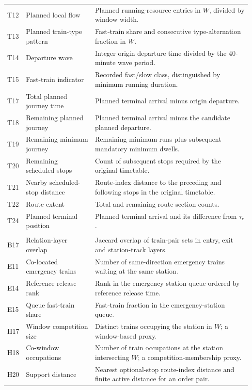 \begin{longtable}{@{}>{\raggedright\arraybackslash}p{0.8cm}>{\raggedright\arraybackslash}p{3.7cm}>{\raggedright\arraybackslash}p{10.0cm}@{}}
T12 & Planned local flow & Planned running-resource entries in $W$, divided by window width. \\
T13 & Planned train-type pattern & Fast-train share and consecutive type-alternation fraction in $W$. \\
T14 & Departure wave & Integer origin departure time divided by the 40-minute wave period. \\
T15 & Fast-train indicator & Recorded fast/slow class, distinguished by minimum running duration. \\
T17 & Total planned journey time & Planned terminal arrival minus origin departure. \\
T18 & Remaining planned journey & Planned terminal arrival minus the candidate planned departure. \\
T19 & Remaining minimum journey & Remaining minimum runs plus subsequent mandatory minimum dwells. \\
T20 & Remaining scheduled stops & Count of subsequent stops required by the original timetable. \\
T21 & Nearby scheduled-stop distance & Route-index distance to the preceding and following stops in the original timetable. \\
T22 & Route extent & Total and remaining route section counts. \\
T24 & Planned terminal position & Planned terminal arrival and its difference from $\tau_e$. \\
\multicolumn{3}{@{}l}{\textbf{Train interactions}}\\*[2pt]
B17 & Relation-layer overlap & Jaccard overlap of train-pair sets in entry, exit and station-track layers. \\
E11 & Co-located emergency trains & Number of same-direction emergency trains waiting at the same station. \\
E14 & Reference release rank & Rank in the emergency-station queue ordered by reference release time. \\
E15 & Queue fast-train share & Fast-train fraction in the emergency-station queue. \\
H17 & Window competition size & Distinct trains occupying the station in $W$; a window-based proxy. \\
H18 & Co-window occupations & Number of train occupations at the station intersecting $W$; a competition-membership proxy. \\
H20 & Support distance & Nearest optional-stop route-index distance and finite active distance for an order pair. \\

\end{longtable}

